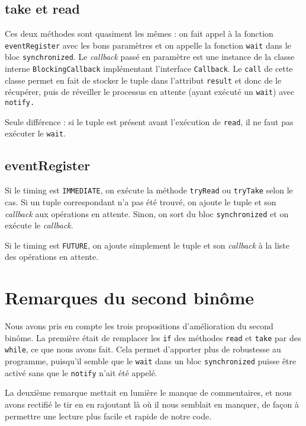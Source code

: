 \documentclass[10pt, a4paper]{article}
\begin{document}
	\subsection{take et read}
		Ces deux méthodes sont quasiment les mêmes : on fait appel à la fonction \texttt{eventRegister} avec les bons paramètres et on appelle la fonction \texttt{wait} dans le bloc \texttt{synchronized}. Le \textit{callback} passé en paramètre est une instance de la classe interne \texttt{BlockingCallback} implémentant l'interface \texttt{Callback}. Le \texttt{call} de cette classe permet en fait de stocker le tuple dans l'attribut \texttt{result} et donc de le récupérer, puis de réveiller le processus en attente (ayant exécuté un \texttt{wait}) avec \texttt{notify.}
		
		Seule différence : si le tuple est présent avant l'exécution de \texttt{read}, il ne faut pas exécuter le \texttt{wait}.
		
	\subsection{eventRegister}
		Si le timing est \texttt{IMMEDIATE}, on exécute la méthode \texttt{tryRead} ou \texttt{tryTake} selon le cas. Si un tuple correspondant n'a pas été trouvé, on ajoute le tuple et son \textit{callback} aux opérations en attente. Sinon, on sort du bloc \texttt{synchronized} et on exécute le \textit{callback}.
		
		Si le timing est \texttt{FUTURE}, on ajoute simplement le tuple et son \textit{callback} à la liste des opérations en attente.
		
\section*{Remarques du second binôme}

	Nous avons pris en compte les trois propositions d'amélioration du second binôme. La première était de remplacer les \texttt{if} des méthodes \texttt{read} et \texttt{take} par des \texttt{while}, ce que nous avons fait. Cela permet d'apporter plus de robustesse au programme, puisqu'il semble que le \texttt{wait} dans un bloc \texttt{synchronized} puisse être activé sans que le \texttt{notify} n'ait été appelé. 
	
	La deuxième remarque mettait en lumière le manque de commentaires, et nous avons rectifié le tir en en rajoutant là où il nous semblait en manquer, de façon à permettre une lecture plus facile et rapide de notre code.
	
\end{document}
